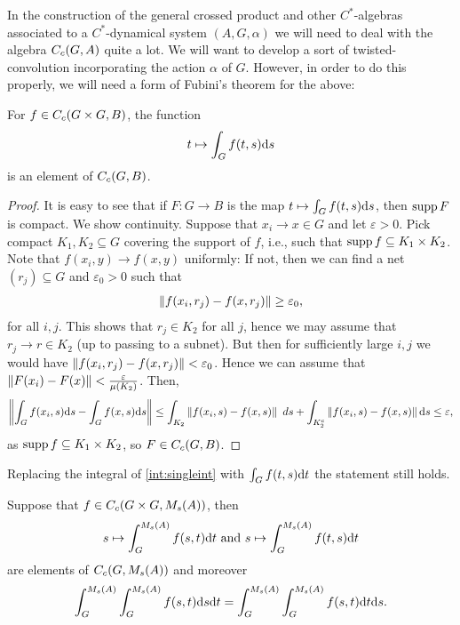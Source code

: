 In the construction of the general crossed product and other $C^*$-algebras associated to a $C^*$-dynamical system $(A,G,\alpha)$ we will need to deal with the algebra $C_c(G,A)$ quite a lot. We will want to develop a sort of twisted-convolution incorporating the action $\alpha$ of $G$. However, in order to do this properly, we will need a form of Fubini's theorem for the above:
\begin{lemma}
For $f \in C_c(G \times G  , B)$, the function
	\begin{align*}
		t \mapsto \int_G f(t,s) \mathrm{d} s
	\end{align*}
	is an element of $C_c(G,B)$.
	\label{int:singleint}
\end{lemma}
\begin{proof}
	It is easy to see that if $F \colon G \to B$ is the map $t \mapsto \int_G f(t,s) \mathrm{d} s$, then $ \operatorname{supp} F$ is compact. We show continuity. Suppose that $x_i \to x \in G$ and let $ \varepsilon > 0$. Pick compact $K_1,K_2 \subseteq G$ covering the support of $f$, i.e., such that $ \operatorname{supp} f \subseteq K_1 \times K_2$. Note that $f(x_i,y) \to f(x,y)$ uniformly: If not, then we can find a net $(r_j)\subseteq G$ and $\varepsilon_0 > 0$ such that
	\begin{align*}
		\left\lVert f(x_i,r_j) - f(x,r_j) \right\rVert \geq \varepsilon_0,
	\end{align*}
	for all $i,j$. This shows that $r_j \in K_2$ for all $j$, hence we may assume that $r_j \to r \in K_2$ (up to passing to a subnet). But then for sufficiently large $i,j$ we would have $\left\lVert f(x_i,r_j) - f(x,r_j) \right\rVert < \varepsilon_0$. Hence we can assume that $\left\lVert F(x_i) - F(x) \right\rVert < \frac{\varepsilon}{ \mu(K_2)}$. Then, 
	\begin{align*}
		\left\lVert \int_G f(x_i,s) \mathrm{d} s - \int_G f(x,s) \mathrm{d} s \right\rVert \leq \int_{K_2} \left\lVert f(x_i,s) - f(x,s) \right\rVert \ d s + \int_{K_2^c} \left\lVert f(x_i,s) - f(x,s) \right\rVert \mathrm{d} s  \leq \varepsilon,
	\end{align*}
	as $\operatorname{supp} f \subseteq K_1 \times K_2$, so $F \in C_c(G,B)$.
\end{proof}
\begin{corollary}
	Replacing the integral of \cref{int:singleint} with $\int_G f(t,s) \mathrm{d} t$ the statement still holds.
\end{corollary}
\begin{theorem}
	Suppose that $f \in C_c(G \times G, M_s(A))$, then 
	\begin{align*}
		s \mapsto \int_G^{M_s(A)} f(s,t) \mathrm{d} t \text{ and } s \mapsto \int_G^{M_s(A)} f(t,s) \mathrm{d} t
	\end{align*}
	are elements of $C_c(G,M_s(A))$ and moreover
	\begin{align*}
		\int_G^{M_s(A)} \int_G^{M_s(A)} f(s,t) \mathrm{d} s \mathrm{d} t = \int_G^{M_s(A)} \int_G^{M_s(A)} f(s,t) \mathrm{d} t \mathrm{d} s.
	\end{align*}
	\label{int:fubini}
\end{theorem}
